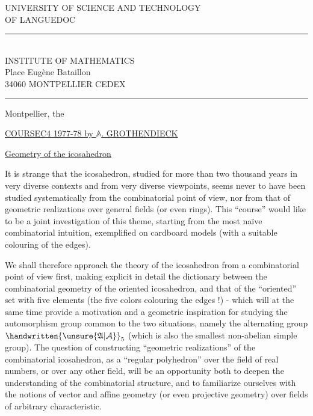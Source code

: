 \noindent\begin{minipage}[t]{0.57\linewidth}
\centering\rmfamily
UNIVERSITY OF SCIENCE AND TECHNOLOGY\\
OF LANGUEDOC\\
\rule{0.55cm}{0.4pt}\\
\sffamily
INSTITUTE OF MATHEMATICS\\
Place Eugène Bataillon\\
34060 MONTPELLIER CEDEX\\
\rule{0.65cm}{0.4pt}
\end{minipage}\hfill
\begin{minipage}[t]{0.37\linewidth}
Montpellier, the
\end{minipage}

\begin{center}
\setlength{\ULdepth}{1.45\baselineskip}
\uline{COURSE\quad C4 1977-78 by $\mathbb A$. GROTHENDIECK}\par\vspace{.6\baselineskip}
\end{center}

\uline{Geometry of the icosahedron}

It is strange that the icosahedron, studied for more than two thousand years in very diverse contexts and from very diverse viewpoints, seems never to have been studied systematically from the combinatorial point of view, nor from that of geometric realizations over general fields (or even rings). This ``course'' would like to be a joint investigation of this theme, starting from the most naïve combinatorial intuition, exemplified on cardboard models (with a suitable colouring of the edges).

We shall therefore approach the theory of the icosahedron from a combinatorial point of view first, making explicit in detail the dictionary between the combinatorial geometry of the oriented icosahedron, and that of the ``oriented'' set with five elements (the five colors colouring the edges !) - which will at the same time provide a motivation and a geometric inspiration for studying the automorphism group common to the two situations, namely the alternating group%
%
 $\handwritten{\unsure{\mathfrak A|\mathcal A}}_5$ (which is also the smallest non-abelian simple group). The question of constructing ``geometric realizations'' of the combinatorial icosahedron, as a ``regular polyhedron'' over the field of real numbers, or over any other field, will be an opportunity both to deepen the understanding of the combinatorial structure, and to familiarize ourselves with the notions of vector and affine geometry (or even projective geometry) over fields of arbitrary characteristic.

